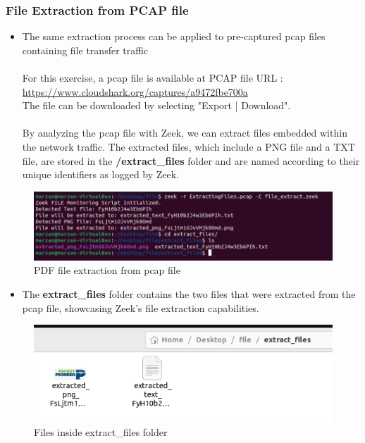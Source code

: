 \subsubsection{File Extraction from PCAP file}
\begin{itemize}
\item The same extraction process can be applied to pre-captured pcap files containing file transfer traffic\\\\
For this exercise, a pcap file is available at
PCAP file URL : \url{https://www.cloudshark.org/captures/a9472fbe700a}\\
The file can be downloaded by selecting "Export | Download".\\\\

By analyzing the pcap file with Zeek, we can extract files embedded within the network traffic.
The extracted files, which include a PNG file and a TXT file, are stored in the \textbf{/extract\_files} folder and are named according to their unique identifiers as logged by Zeek.
 \end{itemize}
\begin{figure}[H]
    \centering
    \includegraphics[width=1\linewidth]{images//extract_file/file_extract_1.png}
    \caption{PDF file extraction from pcap file}
    \label{fig:enter-label}
\end{figure}

\begin{itemize}
\item The \textbf{extract\_files} folder contains the two files that were extracted from the pcap file, showcasing Zeek's file extraction capabilities.
 \end{itemize}
\begin{figure}[H]
    \centering
    \includegraphics[width=0.5\linewidth]{images//extract_file/file_extract_2.png}
    \caption{Files inside extract\_files folder}
    \label{fig:enter-label}
\end{figure}

